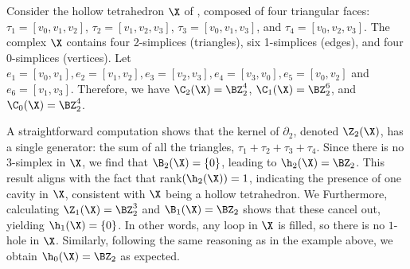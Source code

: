 \begin{example} \label{ex:toy2} Consider the hollow tetrahedron $\X$ of , composed of four triangular faces: $\tau_1 = [v_0, v_1, v_2]$, $\tau_2 = [v_1, v_2, v_3]$, $\tau_3 = [v_0, v_1, v_3]$, and $\tau_4 = [v_0, v_2, v_3]$. The complex $\X$ contains four 2-simplices (triangles), six 1-simplices (edges), and four 0-simplices (vertices). Let $e_1=[v_0,v_1],e_2=[v_1,v_2], e_3=[v_2,v_3],e_4=[v_3,v_0], e_5=[v_0,v_2]$ and $e_6=[v_1,v_3]$. Therefore, we have $\C_2(\X) = \BZ_2^4$, $\C_1(\X) = \BZ_2^6$, and $\C_0(\X) = \BZ_2^4$. 



A straightforward computation shows that the kernel of $\partial_2$, denoted $\Z_2(\X)$, has a single generator: the sum of all the triangles, $\tau_1 + \tau_2 + \tau_3 + \tau_4$. Since there is no 3-simplex in $\X$, we find that $\B_2(\X) = \{0\}$, leading to $\h_2(\X) = \BZ_2$. This result aligns with the fact that rank$(\h_2(\X)) = 1$, indicating the presence of one cavity in $\X$, consistent with $\X$ being a hollow tetrahedron. We 
Furthermore, calculating $\Z_1(\X) = \BZ_2^3$ and $\B_1(\X) = \BZ_2$ shows that these cancel out, yielding $\h_1(\X) = \{0\}$. In other words, any loop in $\X$ is filled, so there is no $1$-hole in $\X$.
Similarly, following the same reasoning as in the example above, we obtain $\h_0(\X) = \BZ_2$ as expected.  
\end{example}








